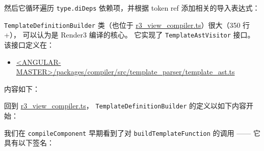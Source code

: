 
然后它循环遍历 \texttt{type.diDeps} 依赖项，并根据 token ref 添加相关的导入表达式：




\texttt{TemplateDefinitionBuilder} 类（也位于
\href{https://github.com/angular/angular/blob/master/packages/compiler/src/render3/r3_view_compiler.ts}
{r3\_view\_compiler.ts}）很大（350 行+），
可以认为是 Render3 编译的核心。
它实现了 \texttt{TemplateAstVisitor} 接口。
该接口定义在：

\begin{itemize}
      \item \href{https://github.com/angular/angular/blob/master/packages/compiler/src/template_parser/template_ast.ts}
            {<ANGULAR-MASTER>/packages/compiler/src/template\_parser/template\_ast.ts}
\end{itemize}


内容如下：




回到
\href{https://github.com/angular/angular/blob/master/packages/compiler/src/render3/r3_view_compiler.ts}
{r3\_view\_compiler.ts}，
\texttt{TemplateDefinitionBuilder} 的定义以如下内容开始：




我们在 \texttt{compileComponent} 早期看到了对 \texttt{buildTemplateFunction} 的调用 —— 它具有以下签名：




